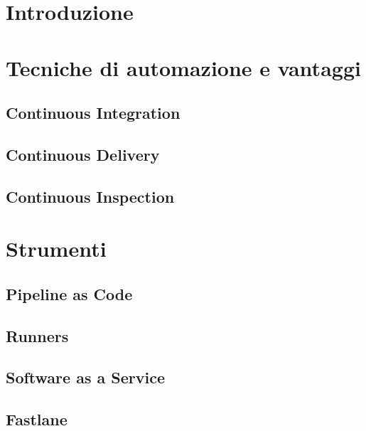 
\section{Introduzione}

\section{Tecniche di automazione e vantaggi}
\subsection{Continuous Integration}

\subsection{Continuous Delivery}

\subsection{Continuous Inspection}

\section{Strumenti}
\subsection{Pipeline as Code}

\subsection{Runners}

\subsection{Software as a Service}

\subsection{Fastlane}


